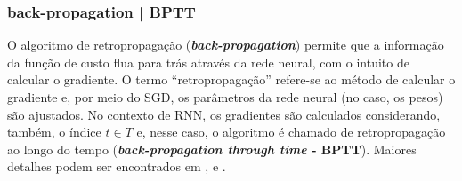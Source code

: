 \documentclass{automatextcc}
\begin{document}
\subsubsection{back-propagation | BPTT}
O algoritmo de retropropagação (\textbf{\textit{back-propagation}}) permite que a informação da função de custo flua para trás através da rede neural, com o intuito de calcular o gradiente. O termo ``retropropagação'' refere-se ao método de calcular o gradiente e, por meio do SGD, os parâmetros da rede neural (no caso, os pesos) são ajustados. No contexto de RNN, os gradientes são calculados considerando, também, o índice $t \in T$ e, nesse caso, o algoritmo é chamado de retropropagação ao longo do tempo (\textbf{\textit{back-propagation through time} - BPTT}). Maiores detalhes podem ser encontrados em \citet{haykin2009}, \citet{goodfellow2016} e \citet{fan2021}.  


\end{document}
